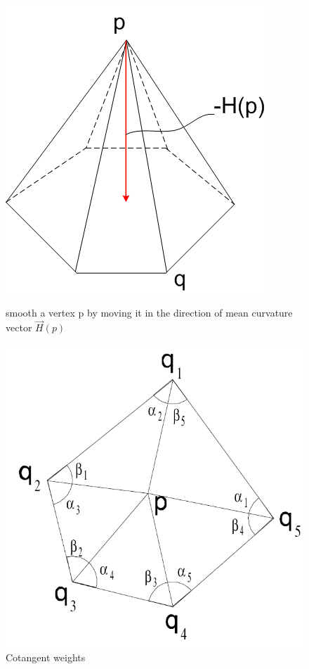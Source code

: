 \documentclass[11pt]{article}
\begin{document}
\begin{figure}[htbp]
  \begin{minipage}[b]{0.5\linewidth}
    \centering
    \includegraphics[width=\textwidth]{umbrella.png}
    \caption{smooth a vertex p by moving it in the direction of mean curvature vector $\vec{H}(p)$}
    \label{fig:umbrella}
  \end{minipage}
  \hspace{0.5cm}
  \begin{minipage}[b]{0.5\linewidth}
    \centering
    \includegraphics[width=\linewidth]{cotangent.png}
    \caption{Cotangent weights}
    \label{fig:cotangent}
  \end{minipage}
\end{figure}
\end{document}
